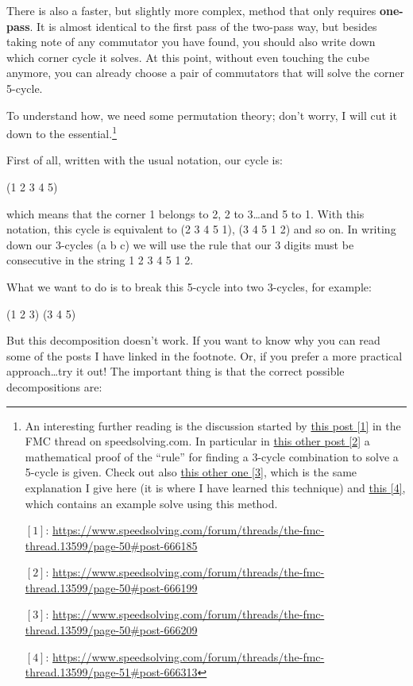 \documentclass[11pt,a4paper]{book}
\begin{document}
There is also a faster, but slightly more complex, method that only requires \textbf{one-pass}. It is almost identical to the first pass of the two-pass way, but besides taking note of any commutator you have found, you should also write down which corner cycle it solves. At this point, without even touching the cube anymore, you can already choose a pair of commutators that will solve the corner 5-cycle.

To understand how, we need some permutation theory; don't worry, I will cut it down to the essential.\footnote{An interesting further reading is the discussion started by \href{{https://www.speedsolving.com/forum/threads/the-fmc-thread.13599/page-50\#post-666185}}{this post [1]} in the FMC thread on speedsolving.com. In particular in \href{https://www.speedsolving.com/forum/threads/the-fmc-thread.13599/page-50\#post-666199}{this other post [2]} a mathematical proof of the ``rule'' for finding a 3-cycle combination to solve a 5-cycle is given. Check out also \href{https://www.speedsolving.com/forum/threads/the-fmc-thread.13599/page-50\#post-666209}{this other one [3]}, which is the same explanation I give here (it is where I have learned this technique) and \href{https://www.speedsolving.com/forum/threads/the-fmc-thread.13599/page-51\#post-666313}{this [4]}, which contains an example solve using this method.

$[1]$: \url{https://www.speedsolving.com/forum/threads/the-fmc-thread.13599/page-50\#post-666185}

$[2]$: \url{https://www.speedsolving.com/forum/threads/the-fmc-thread.13599/page-50\#post-666199}

$[3]$: \url{https://www.speedsolving.com/forum/threads/the-fmc-thread.13599/page-50\#post-666209}

$[4]$: \url{https://www.speedsolving.com/forum/threads/the-fmc-thread.13599/page-51\#post-666313}}

First of all, written with the usual notation, our cycle is:
\begin{center}
(1 2 3 4 5)
\end{center}
which means that the corner 1 belongs to 2, 2 to 3\dots and 5 to 1. With this notation, this cycle is equivalent to (2 3 4 5 1), (3 4 5 1 2) and so on. In writing down our 3-cycles (a b c) we will use the rule that our 3 digits must be consecutive in the string 1 2 3 4 5 1 2.

What we want to do is to break this 5-cycle into two 3-cycles, for example:
\begin{center}
(1 2 3) (3 4 5)
\end{center}
But this decomposition doesn't work. If you want to know why you can read some of the posts I have linked in the footnote. Or, if you prefer a more practical approach\dots try it out! The important thing is that the correct possible decompositions are:
\end{document}

